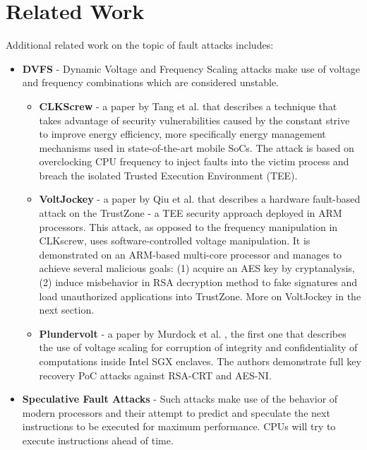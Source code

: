 \section{Related Work} \label{sec:RelatedWork}

Additional related work on the topic of fault attacks includes:

\begin{itemize}

	\item \textbf{DVFS} - Dynamic Voltage and Frequency Scaling 
	attacks make use of voltage and frequency combinations
	which are considered unstable.

	\begin{itemize}

		\item \textbf{CLKScrew} - a paper by 
		Tang et al. \cite{tang2017clkscrew} that describes a technique that takes advantage of security vulnerabilities
		caused by the constant strive to improve energy efficiency, more specifically energy management
		mechanisms used in state-of-the-art mobile SoCs.
		The attack is based on overclocking CPU frequency to inject faults into the victim process and breach the isolated Trusted Execution Environment (TEE).

		\item \textbf{VoltJockey} - a paper by Qiu et al. \cite{qiu2019voltjockey} that describes a hardware fault-based attack on 
		the TrustZone - a TEE security approach deployed in ARM processors.
		This attack, as opposed to the frequency manipulation in CLKscrew,
		uses software-controlled voltage manipulation.
		It is demonstrated on an ARM-based multi-core processor and manages to achieve several malicious goals: (1) acquire an AES key by cryptanalysis, (2) induce misbehavior in RSA decryption method to fake signatures and load unauthorized applications into TrustZone. More on VoltJockey in the next section.
		
		\item \textbf{Plundervolt} - a paper by Murdock et al. \cite{murdock2020plundervolt}, the first one that describes 
		the use of voltage scaling for corruption of integrity and confidentiality
		of computations inside Intel SGX enclaves. The authors demonstrate full key recovery PoC attacks
		against RSA-CRT and AES-NI.
		
		
	\end{itemize}

	\item \textbf{Speculative Fault Attacks} - Such attacks make use of the behavior of modern
	processors and their attempt to predict and speculate the next instructions to be executed
	for maximum performance. CPUs will try to execute instructions ahead of time.


\end{itemize}
